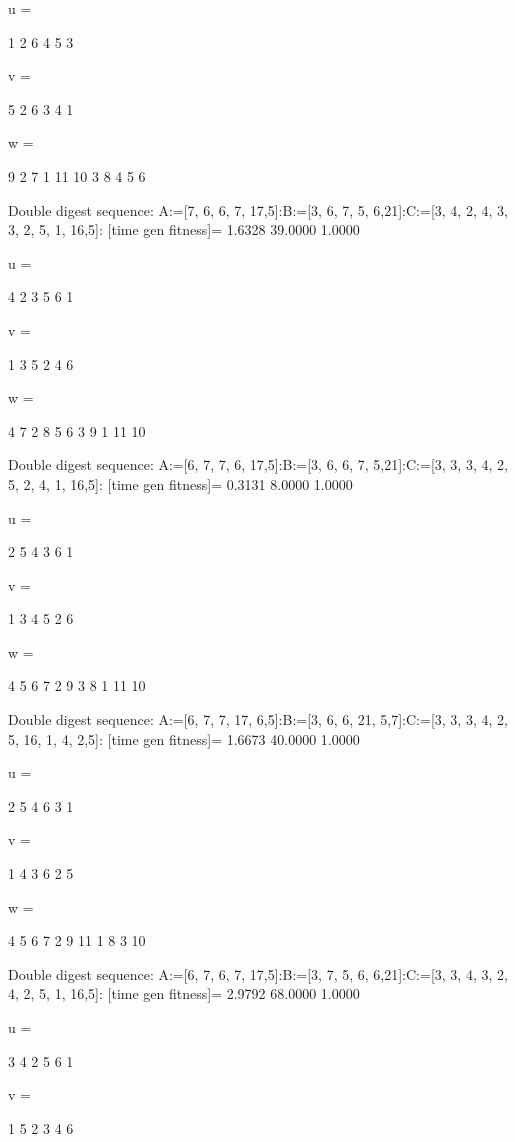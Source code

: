 u =

     1     2     6     4     5     3


v =

     5     2     6     3     4     1


w =

     9     2     7     1    11    10     3     8     4     5     6

Double digest sequence:
A:=[7, 6, 6, 7, 17,5]:B:=[3, 6, 7, 5, 6,21]:C:=[3, 4, 2, 4, 3, 3, 2, 5, 1, 16,5]:
[time gen fitness]=
    1.6328   39.0000    1.0000


u =

     4     2     3     5     6     1


v =

     1     3     5     2     4     6


w =

     4     7     2     8     5     6     3     9     1    11    10

Double digest sequence:
A:=[6, 7, 7, 6, 17,5]:B:=[3, 6, 6, 7, 5,21]:C:=[3, 3, 3, 4, 2, 5, 2, 4, 1, 16,5]:
[time gen fitness]=
    0.3131    8.0000    1.0000


u =

     2     5     4     3     6     1


v =

     1     3     4     5     2     6


w =

     4     5     6     7     2     9     3     8     1    11    10

Double digest sequence:
A:=[6, 7, 7, 17, 6,5]:B:=[3, 6, 6, 21, 5,7]:C:=[3, 3, 3, 4, 2, 5, 16, 1, 4, 2,5]:
[time gen fitness]=
    1.6673   40.0000    1.0000


u =

     2     5     4     6     3     1


v =

     1     4     3     6     2     5


w =

     4     5     6     7     2     9    11     1     8     3    10

Double digest sequence:
A:=[6, 7, 6, 7, 17,5]:B:=[3, 7, 5, 6, 6,21]:C:=[3, 3, 4, 3, 2, 4, 2, 5, 1, 16,5]:
[time gen fitness]=
    2.9792   68.0000    1.0000


u =

     3     4     2     5     6     1


v =

     1     5     2     3     4     6


